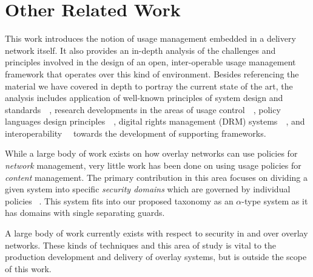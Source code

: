 \section{Other Related Work}
This work introduces the notion of usage management embedded in a delivery network itself.  It also provides an in-depth analysis of the challenges and principles involved in the design of an open, inter-operable usage management framework that operates over this kind of environment. Besides referencing the material we have covered in depth to portray the current state of the art, the analysis includes application of well-known principles of system design and standards~~\cite{BlCl:01,Cl:88,ClWrSoBr:02}, research developments in the areas of usage control~~\cite{PaSa:04,JaHeLa:10}, policy languages design principles~~\cite{JaHeMa:06}, digital rights management (DRM) systems~~\cite{JaHe:09},  and interoperability~~\cite{JaHe:04,HeJa:05,KoLaMaMi:04,coral,marlin} towards the development of supporting frameworks.

While a large body of work exists on how overlay networks can use policies for \textit{network} management, very little work has been done on using usage policies for \textit{content} management.  The primary contribution in this area focuses on dividing a given system into specific \textit{security domains} which are governed by individual policies ~\cite{4457175}.  This system fits into our proposed taxonomy as an $\alpha$-type system as it has domains with single separating guards.

A large body of work currently exists with respect to security in and over overlay networks.  These kinds of techniques and this area of study is vital to the production development and delivery of overlay systems, but is outside the scope of this work.